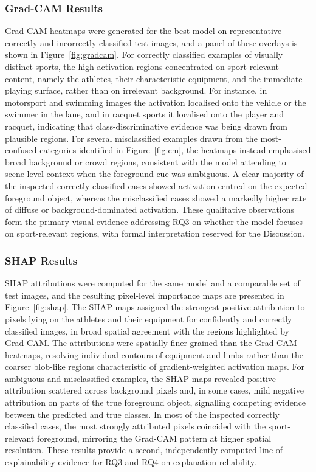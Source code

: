 \subsubsection{Grad-CAM Results}
\label{subsubsec:res-gradcam}

Grad-CAM heatmaps were generated for the best model on representative correctly and incorrectly classified test images, and a panel of these overlays is shown in Figure~\ref{fig:gradcam}.
For correctly classified examples of visually distinct sports, the high-activation regions concentrated on sport-relevant content, namely the athletes, their characteristic equipment, and the immediate playing surface, rather than on irrelevant background.
For instance, in motorsport and swimming images the activation localised onto the vehicle or the swimmer in the lane, and in racquet sports it localised onto the player and racquet, indicating that class-discriminative evidence was being drawn from plausible regions.
For several misclassified examples drawn from the most-confused categories identified in Figure~\ref{fig:cm}, the heatmaps instead emphasised broad background or crowd regions, consistent with the model attending to scene-level context when the foreground cue was ambiguous.
A clear majority of the inspected correctly classified cases showed activation centred on the expected foreground object, whereas the misclassified cases showed a markedly higher rate of diffuse or background-dominated activation.
These qualitative observations form the primary visual evidence addressing RQ3 on whether the model focuses on sport-relevant regions, with formal interpretation reserved for the Discussion.

\subsubsection{SHAP Results}
\label{subsubsec:res-shap}

SHAP attributions were computed for the same model and a comparable set of test images, and the resulting pixel-level importance maps are presented in Figure~\ref{fig:shap}.
The SHAP maps assigned the strongest positive attribution to pixels lying on the athletes and their equipment for confidently and correctly classified images, in broad spatial agreement with the regions highlighted by Grad-CAM.
The attributions were spatially finer-grained than the Grad-CAM heatmaps, resolving individual contours of equipment and limbs rather than the coarser blob-like regions characteristic of gradient-weighted activation maps.
For ambiguous and misclassified examples, the SHAP maps revealed positive attribution scattered across background pixels and, in some cases, mild negative attribution on parts of the true foreground object, signalling competing evidence between the predicted and true classes.
In most of the inspected correctly classified cases, the most strongly attributed pixels coincided with the sport-relevant foreground, mirroring the Grad-CAM pattern at higher spatial resolution.
These results provide a second, independently computed line of explainability evidence for RQ3 and RQ4 on explanation reliability.

